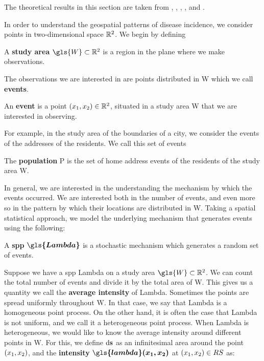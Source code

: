 The theoretical results in this section are taken from \citet{diggle1983spatial},
\citet{diggle1988equivalence},
\citet{guan2008consistent},
\citet{silverman1986density},
and \citet{wand1994kernel}.

In order to understand the geospatial patterns of disease incidence,
we consider points in two-dimensional space $\mathbb{R}^2$.
We begin by defining

\begin{defn}
    A \textbf{study area} $\gls{W} \subset \RS$ is a region in the plane where we make observations.
\end{defn}

The observations we are interested in are points distributed in \gls{W} which we call \textbf{events}.

\begin{defn}
    \label{defn:event}
    An \textbf{event} is a point $(x_1, x_2) \in \mathbb{R}^2$, situated in a study area \gls{W} that we are interested in observing.
\end{defn}

For example, in the study area of the boundaries of a city, we consider the events of the addresses of the residents.
We call this set of events

\begin{defn}
    The \textbf{population} \gls{P} is the set of home address events of the residents of the study area \gls{W}.
\end{defn}

In general, we are interested in the understanding the mechanism by which the events occurred.
We are interested both in the number of events, and even more so in the pattern by which their locations are distributed in \gls{W}.
Taking a spatial statistical approach, we model the underlying mechanism that generates events using the following:

\begin{defn}
    A \textbf{\gls{spp}} $\boldsymbol{\gls{Lambda}}$ is a stochastic mechanism which generates a random set of events.
\end{defn}

Suppose we have a \gls{spp} \gls{Lambda} on a study area $\gls{W} \subset \RS$.
We can count the total number of \glspl{event} and divide it by the total area of \gls{W}.
This gives us a quantity we call the \textbf{average \gls{intensity}} of \gls{Lambda}.
Sometimes the points are spread uniformly throughout \gls{W}.
In that case, we say that \gls{Lambda} is a homogeneous point process.
On the other hand, it is often the case that \gls{Lambda} is not uniform,
and we call it a heterogeneous point process.
When \gls{Lambda} is heterogeneous,
we would like to know the average \gls{intensity} around different points in \gls{W}.
For this, we define $\mathop{}\!\mathrm{d}{\mathbf{s}}$ as an infinitesimal area around the point $(x_1, x_2)$,
and the \textbf{\gls{intensity}} $\boldsymbol{\gls{lambda}\xvec}$ at $(x_1, x_2) \in RS$ as:

